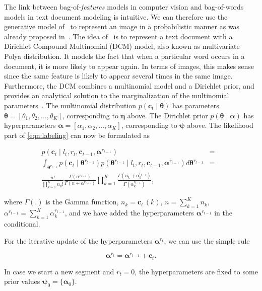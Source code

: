 The link between bag-of-\emph{features} models in computer vision and
bag-of-words models in text document modeling is intuitive. We can therefore use
the generative model of~\cite{madsen05modeling} to represent an image in a
probabilistic manner as was already proposed in~\cite{ranganathan09bayesian}.
The idea of~\cite{madsen05modeling} is to represent a text document with a
Dirichlet Compound Multinomial (DCM) model, also known as multivariate Polya
distribution. It models the fact that when a particular word occurs in a
document, it is more likely to appear again. In terms of images, this makes
sense since the same feature is likely to appear several times in the same
image. Furthermore, the DCM combines a multinomial model and a Dirichlet prior,
and provides an analytical solution to the marginalization of the multinomial
parameters~\cite{minka03estimating}. The multinomial distribution
$p(\mathbf{c}_t\mid\boldsymbol{\theta})$ has parameters $\boldsymbol{\theta}=
[\theta_1,\theta_2,\dots,\theta_K]$, corresponding to $\boldsymbol{\eta}$ above.
The Dirichlet prior $p(\boldsymbol{\theta}\mid\boldsymbol{\alpha})$ has
hyperparameters $\boldsymbol{\alpha}=[\alpha_1,\alpha_2,\dots,\alpha_K]$,
corresponding to $\boldsymbol{\psi}$ above. The likelihood part of
\eqref{eqn:labeling} can now be formulated as

\begin{eqnarray}
\label{eqn:polya}
p(\mathbf{c}_t\mid l_t,r_t,\mathbf{c}_{t-1},\boldsymbol{\alpha}^{r_{t-1}})
&=&\\\nonumber
\int_{\boldsymbol{\theta}^{r_{t-1}}}
p(\mathbf{c}_{t}\mid\boldsymbol{\theta}^{r_{t-1}})
p(\boldsymbol{\theta}^{r_{t-1}}\mid
l_t,r_t,\mathbf{c}_{t-1},\boldsymbol{\alpha}^{r_{t-1}})
d\boldsymbol{\theta}^{r_{t-1}}
&=&\\\nonumber\frac{n!}{\prod_{k=1}^K n_k!}\frac{\Gamma(\alpha^{r_{t-1}})}
{\Gamma(n+\alpha^{r_{t-1}})}\prod_{k=1}^K\frac{\Gamma(n_k+\alpha^{r_{t-1}}_k)}
{\Gamma(\alpha^{r_{t-1}}_k)},
\end{eqnarray}

where $\Gamma(.)$ is the Gamma function, $n_k=\mathbf{c}_t\,(k)$,
$n=\sum_{k=1}^K n_k$,
$\alpha^{r_{t-1}}=\sum_{k=1}^K\alpha^{r_{t-1}}_k$, and we have added the
hyperparameters $\boldsymbol{\alpha}^{r_{t-1}}$ in the conditional.

For the iterative update of the hyperparameters $\boldsymbol{\alpha}^{r_t}$, we
can use the simple rule

\begin{equation}
\label{eqn:alpha_update}
\boldsymbol{\alpha}^{r_t} = \boldsymbol{\alpha}^{r_{t-1}} + \mathbf{c}_{t}.
\end{equation}

In case we start a new segment and $r_t=0$, the hyperparameters are fixed to
some prior values $\boldsymbol{\psi}_0=\{\boldsymbol{\alpha}_0\}$.
